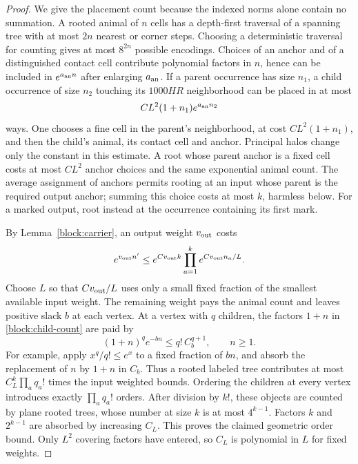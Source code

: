 \begin{proof}
We give the placement count because the indexed norms alone contain
no summation.  A rooted animal of $n$ cells has a depth-first traversal
of a spanning tree with at most $2n$ nearest or corner steps.  Choosing
a deterministic traversal for counting gives at most $8^{2n}$ possible
encodings.  Choices of an anchor and of a distinguished contact cell
contribute polynomial factors in $n$, hence can be included in
$e^{a_{\rm an}n}$ after enlarging $a_{\rm an}$.
If a parent occurrence has size $n_1$, a child occurrence of size $n_2$
touching its $1000HR$ neighborhood can be placed in at most
\begin{equation}
 C L^2(1+n_1)e^{a_{\rm an}n_2}
 \label{block:child-count}
\end{equation}
ways.  One chooses a fine cell in the parent's neighborhood, at cost
$CL^2(1+n_1)$, and then the child's animal, its contact cell and anchor.
Principal halos change only the constant in this estimate.  A root
whose parent anchor is a fixed cell costs at most $CL^2$ anchor choices
and the same exponential animal count.  The average assignment of
anchors permits rooting at an input whose parent is the required
output anchor; summing this choice costs at most $k$, harmless below.
For a marked output, root instead at the occurrence containing its
first mark.

By Lemma~\ref{block:carrier}, an output weight $v_{\rm out}$ costs
\[
 e^{v_{\rm out}n'}\le
       e^{Cv_{\rm out}k}
           \prod_{a=1}^ke^{Cv_{\rm out}n_a/L}.
\]
Choose $L$ so that $Cv_{\rm out}/L$ uses only a small fixed fraction
of the smallest available input weight.  The remaining weight pays
the animal count and leaves positive slack $b$ at each vertex.  At a
vertex with $q$ children, the factors $1+n$ in
\eqref{block:child-count} are paid by
\begin{equation}
 (1+n)^q e^{-bn}\le q!\,C_b^{q+1},\qquad n\ge1.
 \label{block:factorial-slack}
\end{equation}
For example, apply $x^q/q!\le e^x$ to a fixed fraction of $bn$,
and absorb the replacement of $n$ by $1+n$ in $C_b$.
Thus a rooted labeled tree contributes at most
$C_L^k\prod_a q_a!$ times the input weighted bounds.  Ordering the
children at every vertex introduces exactly $\prod_a q_a!$ orders.
After division by $k!$, these objects are counted by plane rooted
trees, whose number at size $k$ is at most $4^{k-1}$.  Factors $k$
and $2^{k-1}$ are absorbed by increasing $C_L$.  This proves the
claimed geometric order bound.  Only $L^2$ covering factors have
entered, so $C_L$ is polynomial in $L$ for fixed weights.


\end{proof}
